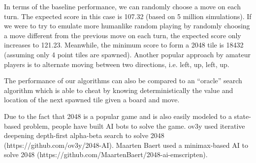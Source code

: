 \documentclass{article}
\begin{document}
In terms of the baseline performance, we can randomly choose a move on each turn. The expected score in this case is 107.32 (based on 5 million simulations). If we were to try to emulate more humanlike random playing by randomly choosing a move different from the previous move on each turn, the expected score only increases to 121.23. Meanwhile, the minimum score to form a 2048 tile is 18432 (assuming only 4 point tiles are spawned). Another popular approach by amateur players is to alternate moving between two directions, i.e. left, up, left, up. 

The performance of our algorithms can also be compared to an “oracle” search algorithm which is able to cheat by knowing deterministically the value and location of the next spawned tile given a board and move. 

Due to the fact that 2048 is a popular game and is also easily modeled to a state-based problem, people have built AI bots to solve the game. ov3y used iterative deepening depth-first alpha-beta search to solve 2048 (https://github.com/ov3y/2048-AI). Maarten Baert used a minimax-based AI to solve 2048 (https://github.com/MaartenBaert/2048-ai-emscripten).
\end{document}
